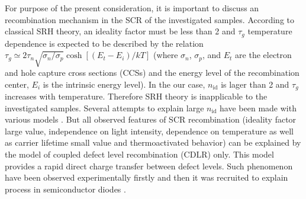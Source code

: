 \documentclass[aip,jap, amsmath,amssymb,reprint]{revtex4-1}
\begin{document}
For purpose of the present consideration, it is important to discuss an recombination mechanism in the SCR of the investigated samples.
According to classical SRH theory, an ideality factor must be less than 2 and
$\tau_g$ temperature dependence is expected \cite{TAUg:Schroder,TAUg:Aharoni} to be described by the relation  $\tau_g\simeq2\tau_n\sqrt{\sigma_n/\sigma_p}\cosh\left[\left(E_t-E_i\right)/kT\right]$
(where $\sigma_n$, $\sigma_p$, and  $E_t$ are the electron and hole capture cross sections (CCSs) and the energy  level of  the  recombination  center,
$E_i$  is the  intrinsic  energy level).
In the our case, $n_{\mathrm{id}}$ is lager than 2 and $\tau_g$ increases with temperature.
Therefore SRH theory is inapplicable to the investigated samples.
Several attempts to explain large $n_{\mathrm{id}}$ have been made with various models \cite{Heide,Beier,Shah,Kaminski_n}.
But all observed features of SCR recombination (ideality factor large value, independence on light intensity, dependence on temperature
as well as carrier lifetime small value and thermoactivated behavior) can be explained by the model of coupled defect level recombination (CDLR) \cite{CDLR:JAP1995,CDLR:JAP} only.
This model provides a rapid  direct  charge  transfer  between  defect levels.
Such phenomenon have been observed experimentally firstly \cite{DAPR:Chen1991,DAPR:Chen1994} and then it was recruited to explain process in semiconductor diodes \cite{CDLR:JAP1995,CDLR:JAP,CDLR:SSP}.
\end{document}

